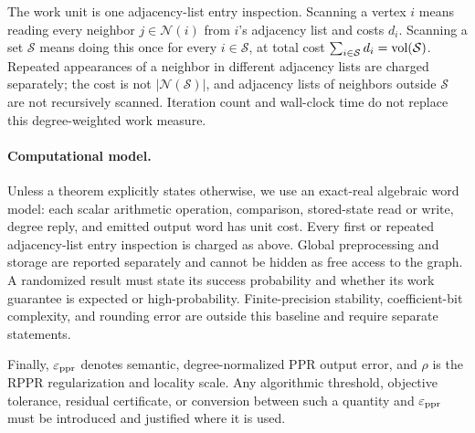 The work unit is one adjacency-list entry inspection. Scanning a vertex \(i\)
means reading every neighbor \(j\in\mathcal N(i)\) from \(i\)'s adjacency
list and costs \(d_i\). Scanning a set \(\mathcal{S}\) means doing this once
for every \(i\in\mathcal{S}\), at total cost
\(\sum_{i\in\mathcal{S}}d_i=\operatorname{vol}(\mathcal{S})\). Repeated appearances of a
neighbor in different adjacency lists are charged separately; the cost is not
\(\lvert\mathcal N(\mathcal{S})\rvert\), and adjacency lists of neighbors
outside \(\mathcal{S}\) are not recursively scanned. Iteration count and
wall-clock time do not replace this degree-weighted work measure.

\paragraph{Computational model.}
Unless a theorem explicitly states otherwise, we use an
exact-real algebraic word model: each scalar arithmetic operation, comparison,
stored-state read or write, degree reply, and emitted output word has unit
cost. Every first or repeated adjacency-list entry inspection is charged as
above. Global preprocessing and storage are reported separately and cannot be
hidden as free access to the graph. A randomized result must state its success
probability and whether its work guarantee is expected or high-probability.
Finite-precision stability, coefficient-bit complexity, and rounding error are
outside this baseline and require separate statements.

Finally, \(\varepsilon_{\mathrm{ppr}}\) denotes semantic,
degree-normalized PPR output error, and \(\rho\) is the RPPR regularization and
locality scale. Any algorithmic threshold, objective tolerance, residual
certificate, or conversion between such a quantity and \(\varepsilon_{\mathrm{ppr}}\) must be
introduced and justified where it is used.
